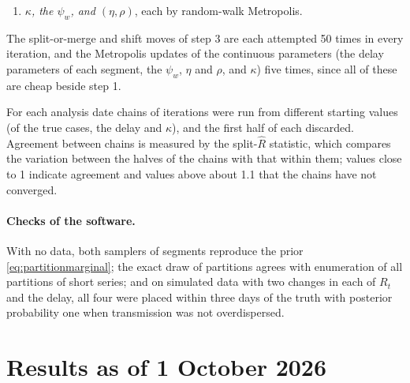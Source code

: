 \documentclass[11pt,a4paper]{article}
\newcommand{\given}{\,|\,}
\begin{document}
\begin{enumerate}[itemsep=2pt]
them) or merges two neighbouring segments; a move which shifts a change by up
to three days; and a random-walk update of $(\mu_0,\sigma_0,s)$. A split of a
segment which can be split in $n$ ways, taking $K$ changes to $K+1$, is
accepted with probability $\min(1,A)$,
\begin{equation}\label{eq:splitratio}
A=\frac{\prod_t L_t(\theta^*)}{\prod_t L_t(\theta_j)}\times
\frac{B(a+K+1,\,b+T-2-K)}{B(a+K,\,b+T-1-K)}\times
\frac{p(\theta^*\given\mu_0,\sigma_0,s)}{q(\theta^*\given\theta_j)}\times n,
\end{equation}
the products being over the onset days which take the new parameters
$\theta^*$ and $q$ being the density from which these were proposed; a merge
is accepted with the reciprocal for the split which would reverse it.
\item \emph{$\kappa$, the $\psi_w$, and $(\eta,\rho)$}, each by random-walk
Metropolis.
\end{enumerate}
The split-or-merge and shift moves of step 3 are each attempted 50 times in
every iteration, and the Metropolis updates of the continuous parameters (the
delay parameters of each segment, the $\psi_w$, $\eta$ and $\rho$, and
$\kappa$) five times, since all of these are cheap beside step 1.

For each analysis date \bvdChains{} chains of \bvdIterations{} iterations were run from
different starting values (of the true cases, the delay and $\kappa$), and
the first half of each discarded. Agreement between chains is measured by the
split-$\widehat R$ statistic, which compares the variation between the halves
of the chains with that within them; values close to 1 indicate agreement and
values above about 1.1 that the chains have not converged.

\paragraph{Checks of the software.} With no data, both samplers of segments
reproduce the prior \eqref{eq:partitionmarginal}; the exact draw of
partitions agrees with enumeration of all partitions of short series; and on
simulated data with two changes in each of $R_t$ and the delay, all four were
placed within three days of the truth with posterior probability one when
transmission was not overdispersed.

\section{Results as of 1 October 2026}
\end{document}
